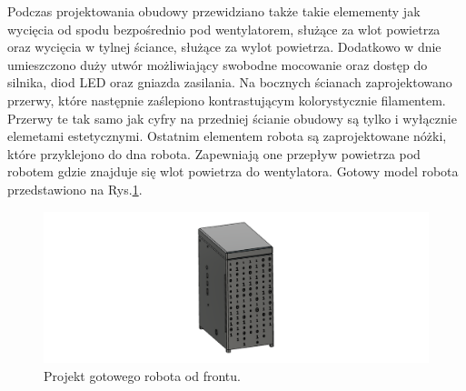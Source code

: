 Podczas projektowania obudowy przewidziano także takie elemementy jak wycięcia od spodu bezpośrednio pod wentylatorem, służące za wlot powietrza 
oraz wycięcia w tylnej ściance, służące za wylot powietrza. Dodatkowo w dnie umieszczono duży utwór możliwiający swobodne mocowanie oraz dostęp do 
silnika, diod LED oraz gniazda zasilania. Na bocznych ścianach zaprojektowano przerwy, które następnie zaślepiono kontrastującym kolorystycznie filamentem.
Przerwy te tak samo jak cyfry na przedniej ścianie obudowy są tylko i wyłącznie elemetami estetycznymi. Ostatnim elementem robota są zaprojektowane nóżki, 
które przyklejono do dna robota. Zapewniają one przepływ powietrza pod robotem gdzie znajduje się wlot powietrza do wentylatora. Gotowy model robota przedstawiono
na Rys.\ref{fig:gotowy}.

\begin{figure}[H]
    \centering
    \includegraphics[width=0.95\linewidth]{chapters/03-praca-wlasna/figures/gotowy2.png}
    \caption{\label{fig:gotowy}Projekt gotowego robota od frontu.}
\end{figure}